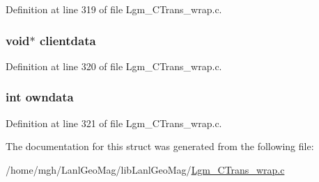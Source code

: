 Definition at line 319 of file Lgm\_\-CTrans\_\-wrap.c.\hypertarget{structswig__type__info_e60177f52d83fcd32268d79f2aa8012f}{
\subsubsection[{clientdata}]{\setlength{\rightskip}{0pt plus 5cm}void$\ast$ {\bf clientdata}}}
\label{structswig__type__info_e60177f52d83fcd32268d79f2aa8012f}




Definition at line 320 of file Lgm\_\-CTrans\_\-wrap.c.\hypertarget{structswig__type__info_25f6d5be66f731f527b185e361b06509}{
\subsubsection[{owndata}]{\setlength{\rightskip}{0pt plus 5cm}int {\bf owndata}}}
\label{structswig__type__info_25f6d5be66f731f527b185e361b06509}




Definition at line 321 of file Lgm\_\-CTrans\_\-wrap.c.

The documentation for this struct was generated from the following file:\begin{CompactItemize}
\item 
/home/mgh/LanlGeoMag/libLanlGeoMag/\hyperlink{_lgm___c_trans__wrap_8c}{Lgm\_\-CTrans\_\-wrap.c}\end{CompactItemize}
